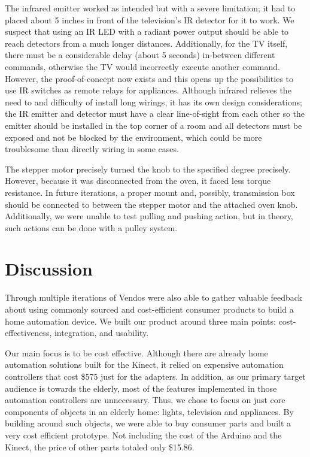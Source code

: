 \documentclass{chi-ext}
\begin{document}
The infrared emitter worked as intended but with a severe limitation;
it had to placed about 5 inches in front of the television's IR detector for it to work.
We suspect that using an IR LED with a radiant power output should be able to reach detectors from a much longer distances.
Additionally, for the TV itself, there must be a considerable delay (about 5 seconds) in-between different commands, otherwise the TV would incorrectly execute another command.
However, the proof-of-concept now exists and this opens up the possibilities to use IR switches as remote relays for appliances.
Although infrared relieves the need to and difficulty of install long wirings, it has its own design considerations;
the IR emitter and detector must have a clear line-of-sight from each other so the emitter should be installed in the top corner of a room and all detectors must be exposed and not be blocked by the environment, which could be more troublesome than directly wiring in some cases.

The stepper motor precisely turned the knob to the specified degree precisely.
However, because it was disconnected from the oven, it faced less torque resistance.
In future iterations, a proper mount and, possibly, transmission box should be connected to between the stepper motor and the attached oven knob.
Additionally, we were unable to test pulling and pushing action, but in theory, such actions can be done with a pulley system.

\section{Discussion}

Through multiple iterations of Vendos were also able to gather valuable feedback about using commonly sourced and cost-efficient consumer products to build a home automation device.
We built our product around three main points: cost-effectiveness, integration, and usability.
 
Our main focus is to be cost effective.
Although there are already home automation solutions built for the Kinect, it relied on expensive automation controllers that cost \$575 \cite{_nitrogen} just for the adapters.
In addition, as our primary target audience is towards the elderly, most of the features implemented in those automation controllers are unnecessary.
Thus, we chose to focus on just core components of objects in an elderly home: lights, television and appliances.
By building around such objects, we were able to buy consumer parts and built a very cost efficient prototype.
Not including the cost of the Arduino and the Kinect, the price of other parts totaled only \$15.86.
 
\end{document}
